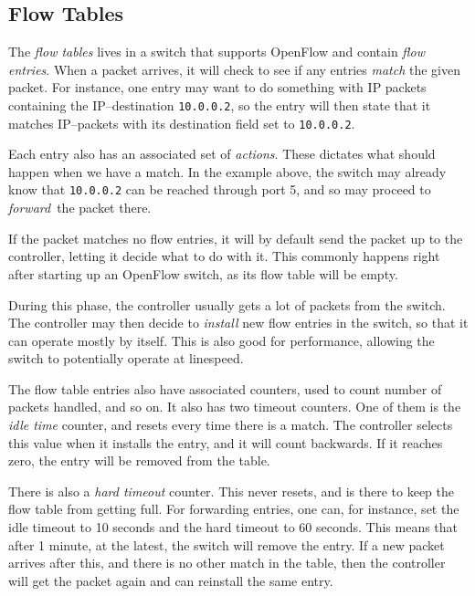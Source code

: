 \subsection{Flow Tables}

The \textit{flow tables} lives in a switch that supports OpenFlow and
contain \textit{flow entries}.  When a packet arrives, it will check to see
if any entries \textit{match} the given packet.  For instance, one entry may
want to do something with \ac{IP} packets containing the IP--destination
\texttt{10.0.0.2}, so the entry
will then state that it matches IP--packets with its destination field set
to \texttt{10.0.0.2}.

Each entry also has an associated set of \textit{actions}.  These dictates
what should happen when we have a match.  In the example above, the switch
may already know that \texttt{10.0.0.2} can be reached through port 5, and
so may proceed to \textit{forward} the packet there.

If the packet matches no flow entries, it will by default send the packet up
to the controller, letting it decide what to do with it.  This commonly
happens right after starting up an OpenFlow switch, as its flow table will
be empty.

During this phase, the controller usually gets a lot of packets from the
switch.  The controller may then decide to \textit{install} new flow entries
in the switch, so that it can operate mostly by itself.  This is also good
for performance, allowing the switch to potentially operate at linespeed.

The flow table entries also have associated counters, used to count number
of packets handled, and so on.  It also has two timeout counters.  One of
them is the \textit{idle time} counter, and resets every time there is a
match.  The controller
selects this value when it installs the entry, and it will count backwards.
If it reaches zero, the entry will be removed from the table.

There is also a \textit{hard timeout} counter.  This never resets, and is
there to keep the flow table from getting full.  For forwarding entries, one
can, for instance, set the idle timeout to 10 seconds and the hard timeout
to 60 seconds.  This means that after 1 minute, at the latest, the switch
will remove the entry.  If a new packet arrives after this, and there is no
other match in the table, then the controller will get the packet again and
can reinstall the same entry.

